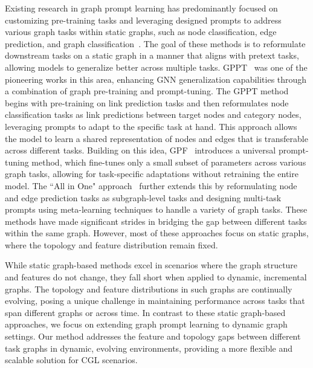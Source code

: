 Existing research in graph prompt learning has predominantly focused on customizing pre-training tasks and leveraging designed prompts to address various graph tasks within static graphs, such as node classification, edge prediction, and graph classification~\cite{sun2022gppt, tan2023virtual, sun2023all, sun2023graph, liu2023graphprompt, fang2024universal}. The goal of these methods is to reformulate downstream tasks on a static graph in a manner that aligns with pretext tasks, allowing models to generalize better across multiple tasks. GPPT~\cite{sun2022gppt} was one of the pioneering works in this area, enhancing GNN generalization capabilities through a combination of graph pre-training and prompt-tuning. The GPPT method begins with pre-training on link prediction tasks and then reformulates node classification tasks as link predictions between target nodes and category nodes, leveraging prompts to adapt to the specific task at hand. This approach allows the model to learn a shared representation of nodes and edges that is transferable across different tasks. Building on this idea, GPF~\cite{fang2024universal} introduces a universal prompt-tuning method, which fine-tunes only a small subset of parameters across various graph tasks, allowing for task-specific adaptations without retraining the entire model. The ``All in One" approach~\cite{sun2023all} further extends this by reformulating node and edge prediction tasks as subgraph-level tasks and designing multi-task prompts using meta-learning techniques to handle a variety of graph tasks. These methods have made significant strides in bridging the gap between different tasks within the same graph. However, most of these approaches focus on static graphs, where the topology and feature distribution remain fixed.

While static graph-based methods excel in scenarios where the graph structure and features do not change, they fall short when applied to dynamic, incremental graphs. The topology and feature distributions in such graphs are continually evolving, posing a unique challenge in maintaining performance across tasks that span different graphs or across time. In contrast to these static graph-based approaches, we focus on extending graph prompt learning to dynamic graph settings. Our method addresses the feature and topology gaps between different task graphs in dynamic, evolving environments, providing a more flexible and scalable solution for CGL scenarios.
